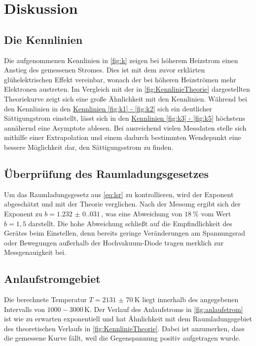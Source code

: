 \section{Diskussion}
\label{sec:Diskussion}

\subsection{Die Kennlinien}
Die aufgenommenen Kennlinien in \autoref{fig:k} zeigen bei höherem Heizstrom einen Anstieg des gemessenen Stromes.
Dies ist mit dem zuvor erklärten glühelektrischen Effekt vereinbar, wonach der bei höheren Heizströmen mehr Elektronen austreten.
Im Vergleich mit der in \autoref{fig:KennlinieTheorie} dargestellten Theoriekurve zeigt sich eine große Ähnlichkeit mit den Kennlinien.
Während bei den Kennlinien in den \hyperref[fig:k]{Kennlinien \ref{fig:k1} - \ref{fig:k2}} sich ein deutlicher Sättigungstrom einstellt,
lässt sich in den \hyperref[fig:k]{Kennlinien \ref{fig:k3} - \ref{fig:k5}} höchstens annähernd eine Asymptote ablesen.
Bei ausreichend vielen Messdaten stelle sich mithilfe einer Extrapolation und einem dadurch bestimmten Wendepunkt eine bessere Möglichkeit dar,
den Sättigungsstrom zu finden.

\subsection{Überprüfung des Raumladungsgesetzes}
Um das Raumladungsgesetz aus \autoref{eq:lsr} zu kontrollieren, wird der Exponent abgeschätzt und mit der Theorie verglichen.
Nach der Messung ergibt sich der Exponent zu $b = \num{1.232(0.031)} \,$, 
was eine Abweichung von $\qty{18}{\percent}$ vom Wert $b = 1,5$ darstellt.
Die hohe Abweichung schließt auf die Empfindlichkeit des Gerätes beim Einstellen, denn bereits
geringe Veränderungen am Spannungsrad oder Bewegungen außerhalb der Hochvakuum-Diode tragen merklich zur Messgenauigkeit bei.

\subsection{Anlaufstromgebiet}
Die berechnete Temperatur $T = \qty{2131(70)}{\kelvin}$ liegt innerhalb des angegebenen Intervalls von $1000 - 3000 \, \mathrm{K}$. 
Der Verlauf des Anlaufstroms in \autoref{fig:anlaufstrom} ist wie zu erwarten exponentiell und
hat Ähnlichkeit mit dem Raumladungsgebiet des theoretischen Verlaufs in \autoref{fig:KennlinieTheorie}.
Dabei ist anzumerken, dass die gemessene Kurve fällt, weil die Gegenspannung positiv aufgetragen wurde.

